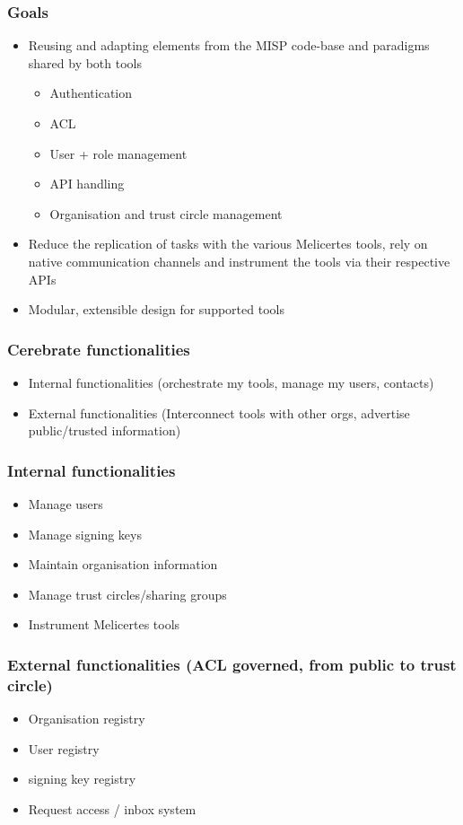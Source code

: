 \begin{frame}
  \frametitle{Goals}
  \begin{itemize}
    \item Reusing and adapting elements from the MISP code-base and paradigms shared by both tools
    \begin{itemize}
      \item Authentication
      \item ACL
      \item User + role management
      \item API handling
      \item Organisation and trust circle management
    \end{itemize}
    \item Reduce the replication of tasks with the various Melicertes tools, rely on native communication channels and instrument the tools via their respective APIs
    \item Modular, extensible design for supported tools
  \end{itemize}
\end{frame}


\begin{frame}
  \frametitle{Cerebrate functionalities}
  \begin{itemize}
    \item Internal functionalities (orchestrate my tools, manage my users, contacts)
    \item External functionalities (Interconnect tools with other orgs, advertise public/trusted information)
  \end{itemize}
\end{frame}

\begin{frame}
  \frametitle{Internal functionalities}
  \begin{itemize}
    \item Manage users
    \item Manage signing keys
    \item Maintain organisation information
    \item Manage trust circles/sharing groups
    \item Instrument Melicertes tools
  \end{itemize}
\end{frame}

\begin{frame}
  \frametitle{External functionalities (ACL governed, from public to trust circle)}
  \begin{itemize}
    \item Organisation registry
    \item User registry
    \item signing key registry
    \item Request access / inbox system
  \end{itemize}
\end{frame}

